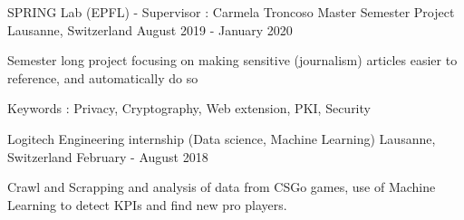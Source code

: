 \begin{cventries}
	\cventry
	{SPRING Lab (EPFL) - Supervisor : Carmela Troncoso} %
	{Master Semester Project} %
	{Lausanne, Switzerland} %
	{August 2019 - January 2020} %
	{ %
		\begin{cvitems}
			\item {Semester long project focusing on making sensitive (journalism) articles easier to reference, and automatically do so}
			\item {Keywords : Privacy, Cryptography, Web extension, PKI, Security}
		\end{cvitems}
	}
	
	
	
	\cventry
	{Logitech} %
	{Engineering internship (Data science, Machine Learning)} %
	{Lausanne, Switzerland} %
	{February - August 2018} %
	{ %
		\begin{cvitems}
			\item {Crawl and Scrapping and analysis of data from CSGo games, use of Machine Learning to detect KPIs and find new pro players.}
		\end{cvitems}
	}
	
	
	
	
	
	
\end{cventries}